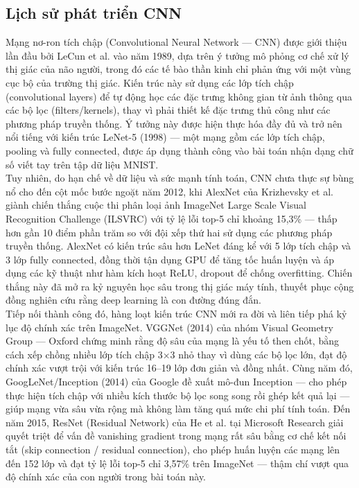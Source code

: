 \subsection{Lịch sử phát triển CNN}
Mạng nơ-ron tích chập (Convolutional Neural Network — CNN) được giới thiệu lần đầu bởi LeCun et al. vào năm 1989, dựa trên ý tưởng mô phỏng cơ chế xử lý thị giác của não người, trong đó các tế bào thần kinh chỉ phản ứng với một vùng cục bộ của trường thị giác. Kiến trúc này sử dụng các lớp tích chập (convolutional layers) để tự động học các đặc trưng không gian từ ảnh thông qua các bộ lọc (filters/kernels), thay vì phải thiết kế đặc trưng thủ công như các phương pháp truyền thống. Ý tưởng này được hiện thực hóa đầy đủ và trở nên nổi tiếng với kiến trúc LeNet-5 (1998) — một mạng gồm các lớp tích chập, pooling và fully connected, được áp dụng thành công vào bài toán nhận dạng chữ số viết tay trên tập dữ liệu MNIST.
\\\indent Tuy nhiên, do hạn chế về dữ liệu và sức mạnh tính toán, CNN chưa thực sự bùng nổ cho đến cột mốc bước ngoặt năm 2012, khi AlexNet của Krizhevsky et al. giành chiến thắng cuộc thi phân loại ảnh ImageNet Large Scale Visual Recognition Challenge (ILSVRC) với tỷ lệ lỗi top-5 chỉ khoảng 15,3\% — thấp hơn gần 10 điểm phần trăm so với đội xếp thứ hai sử dụng các phương pháp truyền thống. AlexNet có kiến trúc sâu hơn LeNet đáng kể với 5 lớp tích chập và 3 lớp fully connected, đồng thời tận dụng GPU để tăng tốc huấn luyện và áp dụng các kỹ thuật như hàm kích hoạt ReLU, dropout để chống overfitting. Chiến thắng này đã mở ra kỷ nguyên học sâu trong thị giác máy tính, thuyết phục cộng đồng nghiên cứu rằng deep learning là con đường đúng đắn.
\\\indent Tiếp nối thành công đó, hàng loạt kiến trúc CNN mới ra đời và liên tiếp phá kỷ lục độ chính xác trên ImageNet. VGGNet (2014) của nhóm Visual Geometry Group — Oxford chứng minh rằng độ sâu của mạng là yếu tố then chốt, bằng cách xếp chồng nhiều lớp tích chập 3×3 nhỏ thay vì dùng các bộ lọc lớn, đạt độ chính xác vượt trội với kiến trúc 16–19 lớp đơn giản và đồng nhất. Cùng năm đó, GoogLeNet/Inception (2014) của Google đề xuất mô-đun Inception — cho phép thực hiện tích chập với nhiều kích thước bộ lọc song song rồi ghép kết quả lại — giúp mạng vừa sâu vừa rộng mà không làm tăng quá mức chi phí tính toán. Đến năm 2015, ResNet (Residual Network) của He et al. tại Microsoft Research giải quyết triệt để vấn đề vanishing gradient trong mạng rất sâu bằng cơ chế kết nối tắt (skip connection / residual connection), cho phép huấn luyện các mạng lên đến 152 lớp và đạt tỷ lệ lỗi top-5 chỉ 3,57\% trên ImageNet — thậm chí vượt qua độ chính xác của con người trong bài toán này.
\newpage
